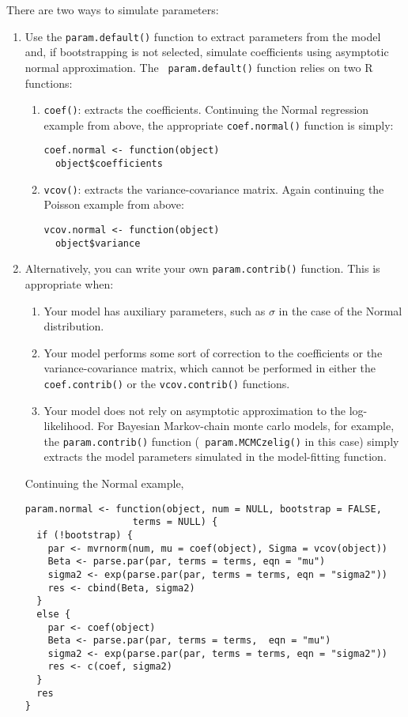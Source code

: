 There are two ways to simulate parameters:
\begin{enumerate}
  
\item Use the {\tt param.default()} function to extract parameters
  from the model and, if bootstrapping is not selected, simulate
  coefficients using asymptotic normal approximation.  The {\tt
    param.default()} function relies on two R functions:

  \begin{enumerate}
  \item {\tt coef()}: extracts the coefficients.  Continuing the
    Normal regression example from above, the appropriate {\tt coef.normal()}
    function is simply:
\begin{verbatim}
coef.normal <- function(object)
  object$coefficients
\end{verbatim} %
  \item {\tt vcov()}: extracts the variance-covariance matrix.  Again
    continuing the Poisson example from above:
\begin{verbatim}
vcov.normal <- function(object)
  object$variance
\end{verbatim} %
\end{enumerate}

\item Alternatively, you can write your own {\tt param.contrib()}
  function.  This is appropriate when:  
  \begin{enumerate}
  \item Your model has auxiliary parameters, such as $\sigma$ in the
    case of the Normal distribution.
  \item Your model performs some sort of correction to the coefficients
    or the variance-covariance matrix, which cannot be performed in
    either the {\tt coef.contrib()} or the {\tt vcov.contrib()}
    functions.
  \item Your model does not rely on asymptotic approximation to the
    log-likelihood.  For Bayesian Markov-chain monte carlo models, for
    example, the {\tt param.contrib()} function ({\tt
      param.MCMCzelig()} in this case) simply extracts the model
    parameters simulated in the model-fitting function.
  \end{enumerate}
  Continuing the Normal example, 
\begin{verbatim}
param.normal <- function(object, num = NULL, bootstrap = FALSE, 
                   terms = NULL) {
  if (!bootstrap) {
    par <- mvrnorm(num, mu = coef(object), Sigma = vcov(object))
    Beta <- parse.par(par, terms = terms, eqn = "mu")
    sigma2 <- exp(parse.par(par, terms = terms, eqn = "sigma2"))
    res <- cbind(Beta, sigma2)
  }
  else {
    par <- coef(object)
    Beta <- parse.par(par, terms = terms,  eqn = "mu")
    sigma2 <- exp(parse.par(par, terms = terms, eqn = "sigma2"))
    res <- c(coef, sigma2)
  }
  res
}
\end{verbatim}
\end{enumerate}

